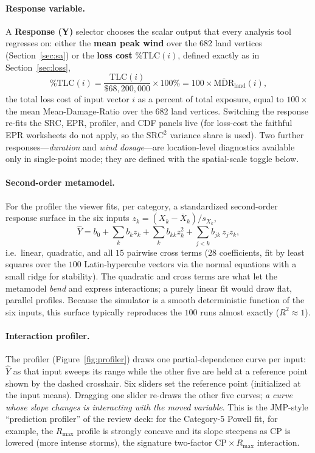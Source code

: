 \documentclass[11pt]{article}
\begin{document}
\paragraph{Response variable.}
A \textbf{Response (Y)} selector chooses the scalar output that every analysis
tool regresses on: either the \textbf{mean peak wind} over the 682 land vertices
(Section~\ref{sec:sa}) or the \textbf{loss cost} $\%\text{TLC}(i)$, defined
exactly as in Section~\ref{sec:loss},
\[
\%\text{TLC}(i)=\frac{\text{TLC}(i)}{\$68{,}200{,}000}\times100\%
=100\times\overline{\text{MDR}}_{\text{land}}(i),
\]
the total loss cost of input vector $i$ as a percent of total exposure, equal to
$100\times$ the mean Mean-Damage-Ratio over the 682 land vertices. Switching the
response re-fits the SRC, EPR, profiler, and CDF panels live (for loss-cost the
faithful EPR worksheets do not apply, so the $\text{SRC}^2$ variance share is
used). Two further responses---\emph{duration} and \emph{wind dosage}---are
location-level diagnostics available only in single-point mode; they are defined
with the spatial-scale toggle below.

\paragraph{Second-order metamodel.}
For the profiler the viewer fits, per category, a standardized second-order
response surface in the six inputs $z_k=(X_k-\bar X_k)/s_{X_k}$,
\[
\hat Y=b_0+\sum_{k} b_k z_k+\sum_{k} b_{kk} z_k^{2}
        +\sum_{j<k} b_{jk}\,z_j z_k ,
\]
i.e.\ linear, quadratic, and all $15$ pairwise cross terms ($28$ coefficients,
fit by least squares over the $100$ Latin-hypercube vectors via the normal
equations with a small ridge for stability). The quadratic and cross terms are
what let the metamodel \emph{bend} and express interactions; a purely linear fit
would draw flat, parallel profiles. Because the simulator is a smooth
deterministic function of the six inputs, this surface typically reproduces the
$100$ runs almost exactly ($R^2\!\approx\!1$).

\paragraph{Interaction profiler.}
The profiler (Figure~\ref{fig:profiler}) draws one partial-dependence curve per
input: $\hat Y$ as that input sweeps its range while the other five are held at a
reference point shown by the dashed crosshair. Six sliders set the reference
point (initialized at the input means). Dragging one slider re-draws the other
five curves; \emph{a curve whose slope changes is interacting with the moved
variable}. This is the JMP-style ``prediction profiler'' of the review deck: for
the Category-5 Powell fit, for example, the $R_{\max}$ profile is strongly
concave and its slope steepens as CP is lowered (more intense storms), the
signature two-factor CP\,$\times$\,$R_{\max}$ interaction.
\end{document}
